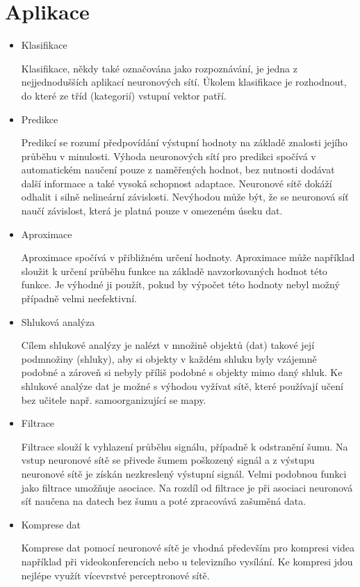 \documentclass[11pt,twoside,a4paper]{book}
\begin{document}
\section{Aplikace}

\begin{itemize}
\item Klasifikace

Klasifikace, někdy také označována jako rozpoznávání, je jedna z nejjednodušších aplikací neuronových sítí. Úkolem klasifikace je rozhodnout, do které ze tříd (kategorií) vstupní vektor patří.
\newpage
\item Predikce

Predikcí se rozumí předpovídání výstupní hodnoty na základě znalosti jejího průběhu v minulosti. Výhoda neuronových sítí pro predikci spočívá v automatickém naučení pouze z naměřených hodnot, bez nutnosti dodávat další informace a také vysoká schopnost adaptace. Neuronové sítě dokáží odhalit i silně nelineární závislosti. Nevýhodou může být, že se neuronová síť naučí závislost, která je platná pouze v omezeném úseku dat. 
\item Aproximace

Aproximace spočívá v přibližném určení hodnoty. Aproximace může například sloužit k určení průběhu funkce na základě navzorkovaných hodnot této funkce. Je výhodné ji použít, pokud by výpočet této hodnoty nebyl možný případně velmi neefektivní.
\item Shluková analýza

Cílem shlukové analýzy je nalézt v množině objektů (dat) takové její podmnožiny (shluky), aby si objekty v každém shluku byly vzájemně podobné a zároveň si nebyly příliš podobné s objekty mimo daný shluk. Ke shlukové analýze dat je možné s výhodou vyžívat sítě, které používají učení bez učitele např. samoorganizující se mapy.
\item Filtrace

Filtrace slouží k vyhlazení průběhu signálu, případně k odstranění šumu. Na vstup neuronové sítě se přivede šumem poškozený signál a z výstupu neuronové sítě je získán nezkreslený výstupní signál. Velmi podobnou funkci jako filtrace umožňuje asociace. Na rozdíl od filtrace je při asociaci neuronová síť naučena na datech bez šumu a poté zpracovává zašuměná data.
\item Komprese dat

Komprese dat pomocí neuronové sítě je vhodná především pro kompresi videa například při videokonferencích nebo u televizního vysílání. Ke kompresi jdou nejlépe využít vícevrstvé perceptronové sítě.
\end{itemize}
\end{document}
